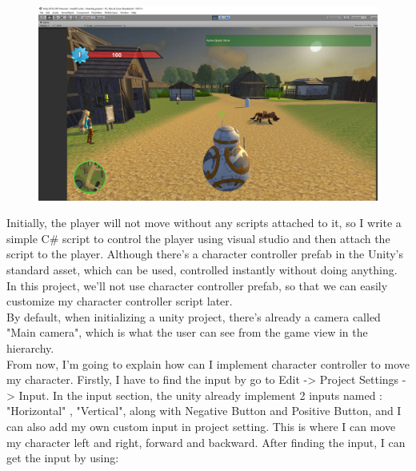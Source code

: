 \documentclass[a4paper, 13pt]{extarticle}
\begin{document}
 	 \begin{figure}[h]
 	 	\centering
 	 	\begin{minipage}{1\textwidth}
 	 		\centering
 	 		\includegraphics[width=0.75\linewidth]{intructions/4.png}
 	 		\label{fig:test5}
 	 	\end{minipage}
 	 \end{figure}
 	  
 	 Initially, the player will not move without any scripts attached to it, so I write a simple C\# script to control the player using visual studio and then attach the script to the player. Although there's a character controller prefab in the Unity's standard asset, which can be used, controlled instantly without doing anything. In this project, we'll not use character controller prefab, so that we can easily customize my character controller script later. \\[0.25cm] By default, when initializing a unity project, there's already a camera called "Main camera", which is what the user can see from the game view in the hierarchy.  
 	 \\[0.25cm] From now, I'm going to explain how can I implement character controller to move my character. Firstly, I have to find the input by go to Edit -> Project Settings -> Input. In the input section, the unity already implement 2 inputs named : "Horizontal" , "Vertical", along with Negative Button and Positive Button, and I can also add my own custom input in project setting. This is where I can move my character left and right, forward and backward. After finding the input, I can get the input by using: 
  
\end{document}
